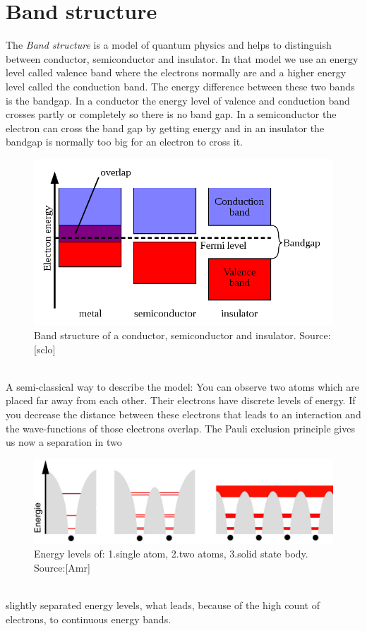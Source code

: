 \section{Band structure}
The \textit{Band structure} is a model of quantum physics and helps to distinguish between conductor, semiconductor and insulator. In that model we use an energy level called valence band where the electrons normally are and a higher energy level called the conduction band. The energy difference between these two bands is the bandgap. In a conductor the energy level of valence and conduction band crosses partly or completely so there is no band gap. In a semiconductor the electron can cross the band gap by getting energy and in an insulator the bandgap is normally too big for an electron to cross it.\\
\begin{figure}[h]
\begin{center}
\includegraphics[scale=0.3]{bilder/isolator-metal}
\caption{ Band structure of a conductor, semiconductor and insulator. Source:[sclo] }
\label{fig:band}
\end{center}
\end{figure}
\\
A semi-classical way to describe the model: You can observe two atoms which are placed far away from each other. Their electrons have discrete levels of energy. If you decrease the distance between these electrons that leads to an interaction and the wave-functions of those electrons overlap. The Pauli exclusion principle gives us now a separation in two
\begin{figure}[h]
\begin{center}
\includegraphics[scale=0.2]{bilder/energieniveaus-pauli}
\caption{Energy levels of: 1.single atom, 2.two atoms, 3.solid state body. Source:[Amr] }
\label{fig:pauli}
\end{center}
\end{figure}
\\
slightly separated energy levels, what leads, because of the high count of electrons, to continuous energy bands.
